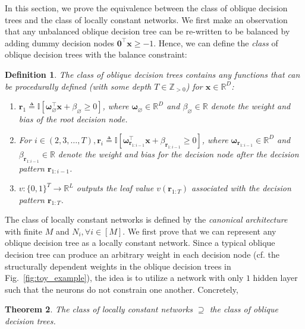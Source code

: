 \documentclass{article} \usepackage{iclr2020_conference,times}
\newtheorem{theorem}{Theorem}\newtheorem{definition}[theorem]{Definition}
\def\vzero{{\bm{0}}}
\def\vr{{\bm{r}}}
\def\vomega{{\bm{\omega}}}
\def\vx{{\bm{x}}}
\def\sR{{\mathbb{R}}}
\def\sZ{{\mathbb{Z}}}
\newcommand{\one}{\mathbb{I}}
\begin{document}
In this section, we prove the equivalence between the class of oblique decision trees and the class of locally constant networks. We first make an observation that any unbalanced oblique decision tree can be re-written to be balanced by adding dummy decision nodes $\vzero^\top\vx \geq -1$. 
Hence, we can define the \emph{class} of oblique decision trees with the balance constraint:
\begin{definition}
The class of oblique decision trees contains any functions that can be procedurally defined (with some depth $T \in \sZ_{>0}$) for $\vx \in \sR^D$:
\begin{enumerate}
\vspace{-2mm}
    \item $\vr_1 \triangleq \one [ \vomega_{\varnothing}^\top \vx + \beta_{\varnothing} \geq 0]$, where $\vomega_{\varnothing} \in \sR^D$ and $\beta_\varnothing \in \sR$ denote the weight and bias of the root decision node.
\vspace{-1.5mm}
    \item For $i \in (2,3,\dots, T), \vr_i \triangleq \one [ \vomega_{\vr_{1:i-1}}^\top \vx + \beta_{\vr_{1:i-1}} \geq 0]$, where $\vomega_{\vr_{1:i-1}} \in \sR^D$ and $\beta_{\vr_{1:i-1}} \in \sR$ denote the weight and bias for the decision node after the decision pattern $\vr_{1:i-1}$.
\vspace{-1.5mm}
    \item $v: \{0, 1\}^T \to \sR^L$ outputs the leaf value $v(\vr_{1:T})$ associated with the decision pattern $\vr_{1:T}$. \!\!\!\!\!
\vspace{-2mm}
\end{enumerate}
\end{definition}
The class of locally constant networks is defined by the \emph{canonical architecture} with finite $M$ and $N_i, \forall i \in [M]$. We first prove that we can represent any oblique decision tree as a locally constant network. Since a typical oblique decision tree can produce an arbitrary weight in each decision node (cf. the structurally dependent weights in the oblique decision trees in Fig.~\ref{fig:toy_example}), the idea is to utilize a network with only $1$ hidden layer such that the neurons do not constrain one another. Concretely,
\begin{theorem}
The class of locally constant networks $\supseteq$ the class of oblique decision trees. 
\end{theorem}
\vspace{-4mm}
\end{document}

